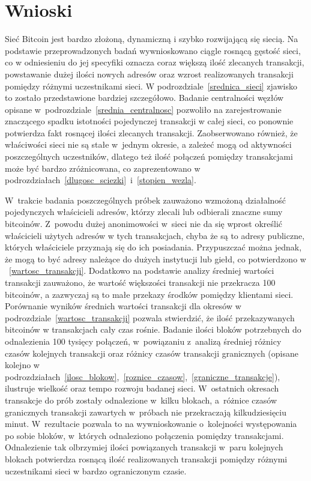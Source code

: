 \documentclass[12pt, oneside, final, openany]{mgr}
\begin{document}
\section{Wnioski}

Sieć Bitcoin jest bardzo złożoną, dynamiczną i szybko rozwijającą się siecią. Na podstawie przeprowadzonych badań wywnioskowano ciągle rosnącą gęstość sieci, co w odniesieniu do jej specyfiki oznacza coraz większą ilość zlecanych transakcji, powstawanie dużej ilości nowych adresów oraz wzrost realizowanych transakcji pomiędzy różnymi uczestnikami sieci. W podrozdziale~\ref{srednica_sieci} zjawisko to zostało przedstawione bardziej szczegółowo. Badanie centralności węzłów opisane w~podrozdziale~\ref{srednia_centralnosc} pozwoliło na zarejestrowanie znaczącego spadku istotności pojedynczej transakcji w całej sieci, co ponownie potwierdza fakt rosnącej ilości zlecanych transakcji. Zaobserwowano również, że właściwości sieci nie są stałe w~jednym okresie, a zależeć mogą od aktywności poszczególnych uczestników, dlatego też ilość połączeń pomiędzy transakcjami może być bardzo zróżnicowana, co zaprezentowano w podrozdziałach~\ref{dlugosc_sciezki}~i~\ref{stopien_wezla}. 

\indent W~trakcie badania poszczególnych próbek zauważono wzmożoną działalność pojedynczych właścicieli adresów, którzy zlecali lub odbierali znaczne sumy bitcoinów. Z~powodu dużej anonimowości w~sieci nie da się wprost określić właścicieli użytych adresów w tych transakcjach, chyba że są to adresy publiczne, których właściciele przyznają się do ich posiadania. Przypuszczać można jednak, że mogą to być adresy należące do dużych instytucji lub giełd, co potwierdzono w ~\ref{wartosc_transakcji}. Dodatkowo na podstawie analizy średniej wartości transakcji zauważono, że wartość większości transakcji nie przekracza 100 bitcoinów, a zazwyczaj są to małe przekazy środków pomiędzy klientami sieci. Porównanie wyników średnich wartości transakcji dla okresów w podrozdziale~\ref{wartosc_transakcji} pozwala stwierdzić, że ilość przekazywanych bitcoinów w transakcjach cały czas rośnie. Badanie ilości bloków potrzebnych do odnalezienia 100 tysięcy połączeń, w~powiązaniu z~analizą średniej różnicy czasów kolejnych transakcji oraz różnicy czasów transakcji granicznych (opisane kolejno w podrozdziałach~\ref{ilosc_blokow},~\ref{roznice_czasow},~\ref{graniczne_transakcje}), ilustruje wielkość oraz tempo rozwoju badanej sieci. W~ostatnich okresach transakcje do prób zostały odnalezione w~kilku blokach, a~różnice czasów granicznych transakcji zawartych w~próbach nie przekraczają kilkudziesięciu minut. W~rezultacie pozwala to na wywnioskowanie o~kolejności występowania po sobie bloków, w~których odnaleziono połączenia pomiędzy transakcjami. Odnalezienie tak olbrzymiej ilości powiązanych transakcji w~paru kolejnych blokach potwierdza rosnącą ilość realizowanych transakcji pomiędzy różnymi uczestnikami sieci w bardzo ograniczonym czasie.
\end{document}
